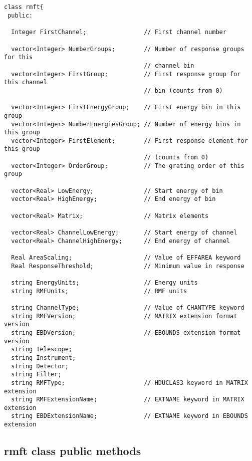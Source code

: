 \documentclass[11pt]{book}
\begin{document}
\begin{verbatim}


class rmft{
 public:

  Integer FirstChannel;                // First channel number 

  vector<Integer> NumberGroups;        // Number of response groups for this 
                                       // channel bin 
  vector<Integer> FirstGroup;          // First response group for this channel
                                       // bin (counts from 0)

  vector<Integer> FirstEnergyGroup;    // First energy bin in this group 
  vector<Integer> NumberEnergiesGroup; // Number of energy bins in this group 
  vector<Integer> FirstElement;        // First response element for this group
                                       // (counts from 0)
  vector<Integer> OrderGroup;          // The grating order of this group 

  vector<Real> LowEnergy;              // Start energy of bin 
  vector<Real> HighEnergy;             // End energy of bin 

  vector<Real> Matrix;                 // Matrix elements 

  vector<Real> ChannelLowEnergy;       // Start energy of channel 
  vector<Real> ChannelHighEnergy;      // End energy of channel 

  Real AreaScaling;                    // Value of EFFAREA keyword 
  Real ResponseThreshold;              // Minimum value in response 

  string EnergyUnits;                  // Energy units
  string RMFUnits;                     // RMF units

  string ChannelType;                  // Value of CHANTYPE keyword 
  string RMFVersion;                   // MATRIX extension format version 
  string EBDVersion;                   // EBOUNDS extension format version 
  string Telescope;                             
  string Instrument;
  string Detector;
  string Filter;
  string RMFType;                      // HDUCLAS3 keyword in MATRIX extension 
  string RMFExtensionName;             // EXTNAME keyword in MATRIX extension 
  string EBDExtensionName;             // EXTNAME keyword in EBOUNDS extension 

\end{verbatim}

\subsection{rmft class public methods}
\end{document}
